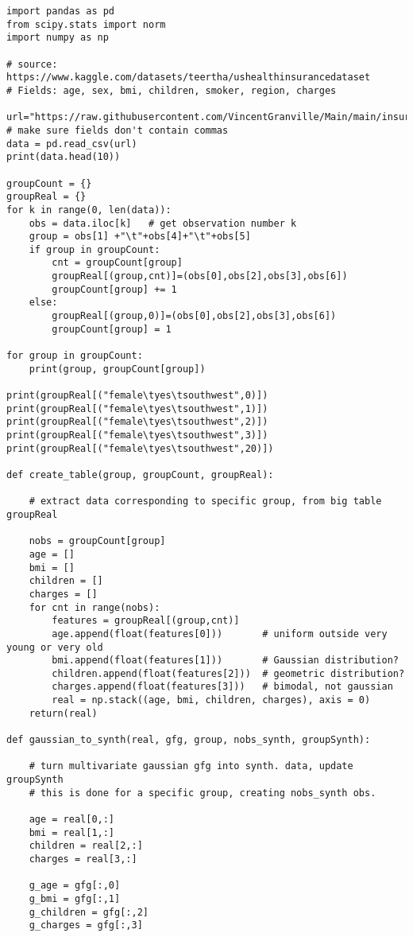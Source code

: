\documentclass[oneside,10pt]{book}
\begin{document}
\begin{lstlisting}
import pandas as pd
from scipy.stats import norm
import numpy as np

# source: https://www.kaggle.com/datasets/teertha/ushealthinsurancedataset
# Fields: age, sex, bmi, children, smoker, region, charges
    
url="https://raw.githubusercontent.com/VincentGranville/Main/main/insurance.csv"
# make sure fields don't contain commas
data = pd.read_csv(url)
print(data.head(10))

groupCount = {}
groupReal = {}
for k in range(0, len(data)):  
    obs = data.iloc[k]   # get observation number k
    group = obs[1] +"\t"+obs[4]+"\t"+obs[5]
    if group in groupCount:
        cnt = groupCount[group]
        groupReal[(group,cnt)]=(obs[0],obs[2],obs[3],obs[6]) 
        groupCount[group] += 1    
    else:
        groupReal[(group,0)]=(obs[0],obs[2],obs[3],obs[6]) 
        groupCount[group] = 1

for group in groupCount:
    print(group, groupCount[group])

print(groupReal[("female\tyes\tsouthwest",0)])
print(groupReal[("female\tyes\tsouthwest",1)])
print(groupReal[("female\tyes\tsouthwest",2)])
print(groupReal[("female\tyes\tsouthwest",3)])
print(groupReal[("female\tyes\tsouthwest",20)])

def create_table(group, groupCount, groupReal):

    # extract data corresponding to specific group, from big table groupReal

    nobs = groupCount[group]
    age = []
    bmi = []
    children = []
    charges = []
    for cnt in range(nobs):
        features = groupReal[(group,cnt)]
        age.append(float(features[0]))       # uniform outside very young or very old
        bmi.append(float(features[1]))       # Gaussian distribution?
        children.append(float(features[2]))  # geometric distribution?
        charges.append(float(features[3]))   # bimodal, not gaussian 
        real = np.stack((age, bmi, children, charges), axis = 0)
    return(real)

def gaussian_to_synth(real, gfg, group, nobs_synth, groupSynth):

    # turn multivariate gaussian gfg into synth. data, update groupSynth 
    # this is done for a specific group, creating nobs_synth obs.

    age = real[0,:]
    bmi = real[1,:]
    children = real[2,:]
    charges = real[3,:]

    g_age = gfg[:,0]
    g_bmi = gfg[:,1]
    g_children = gfg[:,2]
    g_charges = gfg[:,3]


\end{lstlisting}
\end{document}
